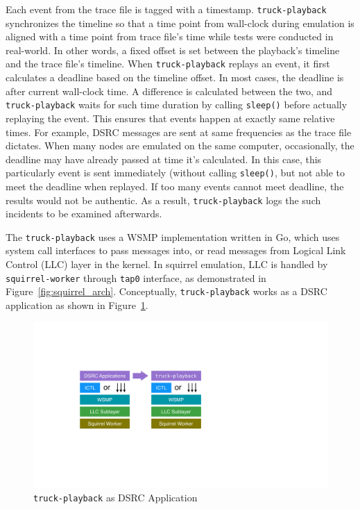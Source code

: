 \documentclass[12pt]{report}
\begin{document}
Each event from the trace file is tagged with a timestamp. \texttt{truck-playback} synchronizes the timeline so that a time point from wall-clock during emulation is aligned with a time point from trace file's time while tests were conducted in real-world. In other words, a fixed offset is set between the playback's timeline and the trace file's timeline. When \texttt{truck-playback} replays an event, it first calculates a deadline based on the timeline offset. In most cases, the deadline is after current wall-clock time. A difference is calculated between the two, and \texttt{truck-playback} waits for such time duration by calling \texttt{sleep()} before actually replaying the event. This ensures that events happen at exactly same relative times. For example, DSRC messages are sent at same frequencies as the trace file dictates. When many nodes are emulated on the same computer, occasionally, the deadline may have already passed at time it's calculated. In this case, this particularly event is sent immediately (without calling \texttt{sleep()}, but not able to meet the deadline when replayed. If too many events cannot meet deadline, the results would not be authentic. As a result, \texttt{truck-playback} logs the such incidents to be examined afterwards.

The \texttt{truck-playback} uses a WSMP implementation written in Go, which uses system call interfaces to pass messages into, or read messages from Logical Link Control (LLC) layer in the kernel. In squirrel emulation, LLC is handled by \texttt{squirrel-worker} through \texttt{tap0} interface, as demonstrated in Figure~\ref{fig:squirrel_arch}. Conceptually, \texttt{truck-playback} works as a DSRC application as shown in Figure~\ref{fig:playback_arch}.

\begin{figure}[h]
  \begin{center}
    \includegraphics[width=.6\textwidth]{figures/playback_arch.pdf}
    \caption{\label{fig:playback_arch}\texttt{truck-playback} as DSRC Application}
  \end{center}
\end{figure}
\end{document}

